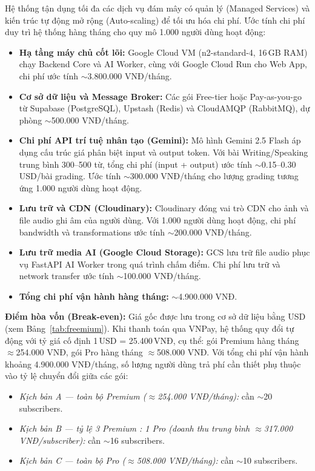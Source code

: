 Hệ thống tận dụng tối đa các dịch vụ đám mây có quản lý (Managed Services) và kiến trúc tự động mở rộng (Auto-scaling) để tối ưu hóa chi phí. Ước tính chi phí duy trì hệ thống hàng tháng cho quy mô 1.000 người dùng hoạt động:

\begin{itemize}
    \item \textbf{Hạ tầng máy chủ cốt lõi:} Google Cloud VM (n2-standard-4, 16\,GB RAM) chạy Backend Core và AI Worker, cùng với Google Cloud Run cho Web App, chi phí ước tính $\sim$3.800.000 VNĐ/tháng.

    \item \textbf{Cơ sở dữ liệu và Message Broker:} Các gói Free-tier hoặc Pay-as-you-go từ Supabase (PostgreSQL), Upstash (Redis) và CloudAMQP (RabbitMQ), dự phòng $\sim$500.000 VNĐ/tháng.

    \item \textbf{Chi phí API trí tuệ nhân tạo (Gemini):} Mô hình Gemini 2.5 Flash áp dụng cấu trúc giá phân biệt input và output token. Với bài Writing/Speaking trung bình 300--500 từ, tổng chi phí (input + output) ước tính $\sim$0.15--0.30\,USD/bài grading. Ước tính $\sim$300.000 VNĐ/tháng cho lượng grading tương ứng 1.000 người dùng hoạt động.

    \item \textbf{Lưu trữ và CDN (Cloudinary):} Cloudinary đóng vai trò CDN cho ảnh và file audio ghi âm của người dùng. Với 1.000 người dùng hoạt động, chi phí bandwidth và transformations ước tính $\sim$200.000 VNĐ/tháng.

    \item \textbf{Lưu trữ media AI (Google Cloud Storage):} GCS lưu trữ file audio phục vụ FastAPI AI Worker trong quá trình chấm điểm. Chi phí lưu trữ và network transfer ước tính $\sim$100.000 VNĐ/tháng.

    \item \textbf{Tổng chi phí vận hành hàng tháng:} $\sim$4.900.000 VNĐ.
\end{itemize}

\textbf{Điểm hòa vốn (Break-even):} Giá gốc được lưu trong cơ sở dữ liệu bằng USD (xem Bảng~\ref{tab:freemium}). Khi thanh toán qua VNPay, hệ thống quy đổi tự động với tỷ giá cố định 1\,USD = 25.400\,VNĐ, cụ thể: gói Premium hàng tháng $\approx$254.000 VNĐ, gói Pro hàng tháng $\approx$508.000 VNĐ. Với tổng chi phí vận hành khoảng 4.900.000 VNĐ/tháng, số lượng người dùng trả phí cần thiết phụ thuộc vào tỷ lệ chuyển đổi giữa các gói:

\begin{itemize}
    \item \textit{Kịch bản A --- toàn bộ Premium ($\approx$254.000 VNĐ/tháng):} cần $\sim$20 subscribers.
    \item \textit{Kịch bản B --- tỷ lệ 3 Premium : 1 Pro (doanh thu trung bình $\approx$317.000 VNĐ/subscriber):} cần $\sim$16 subscribers.
    \item \textit{Kịch bản C --- toàn bộ Pro ($\approx$508.000 VNĐ/tháng):} cần $\sim$10 subscribers.
\end{itemize}


